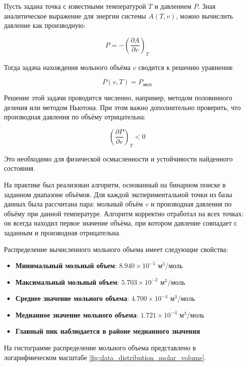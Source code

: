 \documentclass[a4paper,12pt]{article}
\begin{document}
      Пусть задана точка с известными температурой \( T \) и давлением \( P \). Зная аналитическое выражение для энергии системы \( A(T, v) \), можно вычислить давление как производную:
      
      \[
      P = -\left( \frac{\partial A}{\partial v} \right)_T
      \]
      
      Тогда задача нахождения мольного объёма \( v \) сводится к решению уравнения:
      
      \[
      P(v, T) = P_{\text{эксп}}
      \]
      
      Решение этой задачи проводится численно, например, методом половинного деления или методом Ньютона. При этом важно дополнительно проверить, что производная давления по объёму отрицательна:
      
      \[
      \left( \frac{\partial P}{\partial v} \right)_T < 0
      \]
      
      Это необходимо для физической осмысленности и устойчивости найденного состояния.
      
      На практике был реализован алгоритм, основанный на бинарном поиске в заданном диапазоне объёмов. Для каждой экспериментальной точки из базы данных была рассчитана пара: мольный объём \( v \) и производная давления по объёму при данной температуре. Алгоритм корректно отработал на всех точках: он всегда находил первое значение объёма, при котором давление совпадает с заданным и производная отрицательна.
      
      Распределение вычисленного мольного объема имеет следующие свойства:

      \begin{itemize}
          \item \textbf{Минимальный мольный объем}: \(8.940 \times 10^{-5}\) м\(^3\)/моль
          \item \textbf{Максимальный мольный объем}: \(5.703 \times 10^{-2}\) м\(^3\)/моль
          \item \textbf{Среднее значение мольного объема}: \(4.700 \times 10^{-4}\) м\(^3\)/моль
          \item \textbf{Медианное значение мольного объема}: \(1.721 \times 10^{-4}\) м\(^3\)/моль
          \item \textbf{Главный пик наблюдается в районе медианного значения} 
      \end{itemize}
      
      На гистограмме распределение мольного объема представлено в логарифмическом масштабе \autoref{fig:data_distribution_molar_volume}.
      
\end{document}
